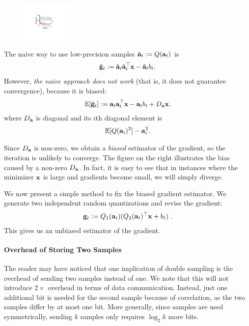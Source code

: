 \documentclass{article}
\def\a{{\bf a}}
\def\g{{\bf g}}
\def\x{{\bf x}}
\def\E{\mathbb{E}}
\begin{document}
\begin{figure}
  \begin{center}
  \vspace{-6mm}
    \includegraphics[width=0.23\textwidth]{micro-experiments/gap.pdf}
  \end{center}
      \vspace{-5mm}
  \label{fig:gap}
\end{figure}
The naive way to use low-precision samples $\hat{\a}_t := Q(\a_t)$ is 
\[
\hat{\g}_t := \hat{\a}_t \hat{\a}_t^\top \x - \hat{\a}_t b_t.
\]
However, \emph{the naive approach does not work} (that is, it does not guarantee convergence), because it is biased: 
\[
\E[\hat{\g}_t] := \a_t \a_t^\top \x - \a_t b_t + D_{\a} \x, 
\]
where $D_{\a}$ is diagonal and its $i$th diagonal element is 
\[
\E[ Q(\a_i)^2 ] - \a_i^2.
\]

\vspace{-0.5em}
Since $D_{\a}$ is non-zero, we obtain a \emph{biased} estimator of the gradient, so the iteration is unlikely to converge. 
The figure on the right illustrates the bias caused by a non-zero $D_{\a}$. In fact, it is easy to see that in instances where the minimizer $\x$ is large and gradients become small, we will simply diverge. 

We now present a simple method to fix the biased gradient estimator. We generate two independent random quantizations and revise the gradient:
\begin{align}
\g_t := Q_1 (\a_t) (Q_2 (\a_t)^\top \x + b_t) \; .
\label{eq:double}
\end{align}
This gives us an unbiased estimator of the gradient. 

\paragraph*{Overhead of Storing Two Samples}
The reader may have noticed that one implication of double sampling is the overhead of sending
two samples instead of one. We note that this will not introduce $2\times$
overhead in terms of data communication. Instead, just one additional bit
is needed for the second sample because of correlation, as the two samples 
differ by at most one bit. More generally, since samples
are used symmetrically, sending $k$ samples only requires $\log_2 k$ more bits.
\end{document}

